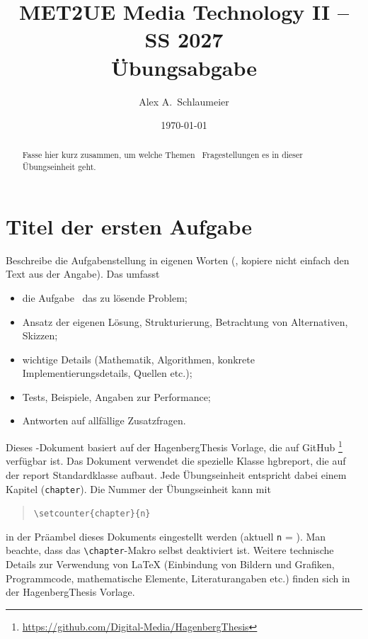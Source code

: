 \documentclass[language=german,titlepage=false,smartquotes=true]{hgbreport}
\renewcommand{\chapter}[1]{} %
\begin{document}

\author{Alex A.\ Schlaumeier}                  %
\title{MET2UE Media Technology II -- SS 2027\\ %
				Übungsabgabe }
\date{\today}

\maketitle

\begin{abstract}\noindent
Fasse hier kurz zusammen, um welche Themen \bzw\ Fragestellungen es in dieser
Übungseinheit geht.
\end{abstract}


\section{Titel der ersten Aufgabe}

Beschreibe die Aufgabenstellung in eigenen Worten 
(\dah, kopiere nicht einfach den Text aus der Angabe).
Das umfasst \ia 
%
\begin{itemize}
	\item die Aufgabe \bzw\ das zu lösende Problem;
	\item Ansatz der eigenen Lösung, Strukturierung, Betrachtung von
	Alternativen, Skizzen;
	\item wichtige Details (Mathematik, Algorithmen, konkrete
	Implementierungsdetails, Quellen \cite{Sedgewick2011} %
	etc.);
	\item Tests, Beispiele, Angaben zur Performance;
	\item Antworten auf allfällige Zusatzfragen.
\end{itemize}

Dieses \latex-Dokument basiert auf der \textsf{HagenbergThesis} Vorlage, die
auf GitHub%
\footnote{\url{https://github.com/Digital-Media/HagenbergThesis}}
verfügbar ist. Das Dokument verwendet die spezielle Klasse \textsf{hgbreport},
die auf der \textsf{report} Standardklasse aufbaut. Jede Übungseinheit
entspricht dabei einem Kapitel (\texttt{chapter}). Die Nummer der Übungseinheit
kann mit
%
\begin{quote}
\verb!\setcounter{chapter}{n}!
\end{quote}
%
in der Präambel dieses Dokuments eingestellt werden (aktuell \texttt{n} =
). Man beachte, dass das \verb!\chapter!-Makro selbst
deaktiviert ist. Weitere technische Details zur Verwendung von LaTeX
(Einbindung von Bildern und Grafiken, Programmcode, mathematische Elemente,
Literaturangaben etc.) finden sich in der \textsf{HagenbergThesis} Vorlage.
\end{document}
